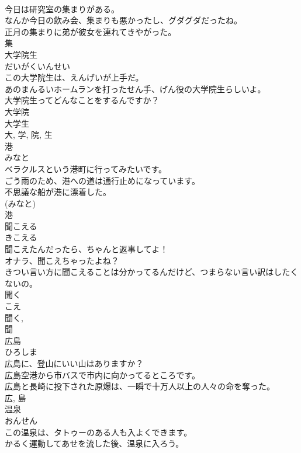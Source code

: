 \documentclass[8pt]{extreport}
\begin{document}
\begin{CJK}{UTF8}{min}
\\	今日は研究室の集まりがある。	
\\	なんか今日の飲み会、集まりも悪かったし、グダグダだったね。	
\\	正月の集まりに弟が彼女を連れてきやがった。	
\\	集	
\\	大学院生	
\\	だいがくいんせい	
\\	この大学院生は、えんげいが上手だ。	
\\	あのまんるいホームランを打ったせん手、げん役の大学院生らしいよ。	
\\	大学院生ってどんなことをするんですか？	
\\	大学院 
\\	大学生 
\\	大, 学, 院, 生	
\\	港	
\\	みなと	
\\	ベラクルスという港町に行ってみたいです。	
\\	ごう雨のため、港への道は通行止めになっています。	
\\	不思議な船が港に漂着した。	
\\	(みなと) 
\\	港	
\\	聞こえる	
\\	きこえる	
\\	聞こえたんだったら、ちゃんと返事してよ！	
\\	オナラ、聞こえちゃったよね？	
\\	きつい言い方に聞こえることは分かってるんだけど、つまらない言い訳はしたくないの。	
\\	聞く 
\\	こえ 
\\	聞く, 
\\	聞	
\\	広島	
\\	ひろしま	
\\	広島に、登山にいい山はありますか？	
\\	広島空港から市バスで市内に向かってるところです。	
\\	広島と長崎に投下された原爆は、一瞬で十万人以上の人々の命を奪った。	
\\	広, 島	
\\	温泉	
\\	おんせん	
\\	この温泉は、タトゥーのある人も入よくできます。	
\\	かるく運動してあせを流した後、温泉に入ろう。	

\end{CJK}
\end{document}
